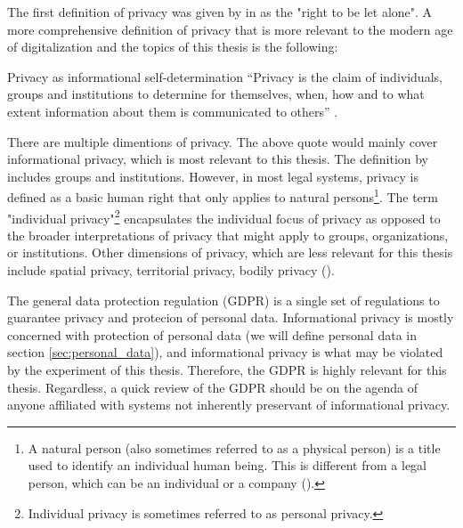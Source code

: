 The first definition of privacy was given by \citeauthor{br1890righttoprivacy} in \citeyear{br1890righttoprivacy} as the "right to be let alone". A more comprehensive definition of privacy that is more relevant to the modern age of digitalization and the topics of this thesis is the following:

\begin{myquote}{Privacy as informational self-determination}
    “Privacy is the claim of individuals, groups and institutions to determine for themselves, when, how and to what extent information about them is communicated to others” \cite{we1967privacydefinition}.
\end{myquote}

There are multiple dimentions of privacy. The above quote would mainly cover informational privacy, which is most relevant to this thesis. The definition by \citeauthor{we1967privacydefinition} includes groups and institutions. However, in most legal systems, privacy is defined as a basic human right that only applies to natural persons\footnote{A natural person (also sometimes referred to as a physical person) is a title used to identify an individual human being. This is different from a legal person, which can be an individual or a company (\cite{te2023naturalperson}).}. The term "individual privacy"\footnote{Individual privacy is sometimes referred to as personal privacy.} encapsulates the individual focus of privacy as opposed to the broader interpretations of privacy that might apply to groups, organizations, or institutions. Other dimensions of privacy, which are less relevant for this thesis include spatial privacy, territorial privacy, bodily privacy (\cite{fi2017privacybookchapter53}). 

The general data protection regulation (GDPR) is a single set of regulations to guarantee privacy and protecion of personal data. Informational privacy is mostly concerned with protection of personal data (we will define personal data in section \ref{sec:personal_data}), and informational privacy is what may be violated by the experiment of this thesis. Therefore, the GDPR is highly relevant for this thesis. Regardless, a quick review of the GDPR should be on the agenda of anyone affiliated with systems not inherently preservant of informational privacy.


